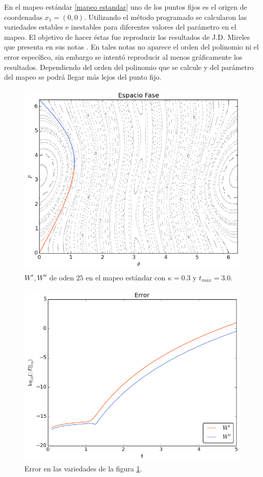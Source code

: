 En el mapeo estándar \ref{mapeo estandar} uno de los puntos fijos es el origen de coordenadas $x_{1}=(0,0)$. Utilizando el método programado se calcularon las variedades estables e inestables para diferentes valores del parámetro en el mapeo. El objetivo de hacer éstas fue reproducir los resultados de J.D. Mireles que presenta en sus notas \cite{Mireles}. En tales notas no aparece el orden del polinomio ni el error específico, sin embargo se intentó reproducir al menos gráficamente los resultados. Dependiendo del orden del polinomio que se calcule y del parámetro del mapeo se podrá llegar más lejos del punto fijo.  
\begin{figure}[H]
 \centering
 \includegraphics[scale=0.6]{estandark03}
 \caption{$W^{s},W^{u}$ de oden $25$ en el mapeo estándar con $\kappa=0.3$ y $t_{max}=3.0$.}
 \label{estandar03}
\end{figure}

\begin{figure}[H]
\centering
\includegraphics[scale=0.6]{error_est_k03} 
\caption{Error en las variedades de la figura \ref{estandar03}.}
\label{error est k03}
\end{figure}



